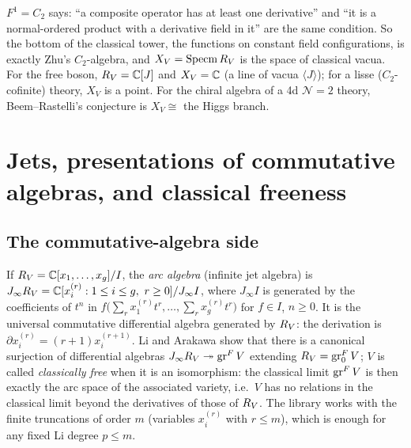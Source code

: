 \begin{physics}
$F^1 = C_2$ says: ``a composite operator has at least one derivative'' and ``it is a normal-ordered product
with a derivative field in it'' are the same condition. So the bottom of the classical tower, the functions
on constant field configurations, is exactly Zhu's $C_2$-algebra, and $X_V = \operatorname{Specm}R_V$
is the space of classical vacua. For the free boson, $R_V = {\mathbb{C}}[J]$ and $X_V = {\mathbb{C}}$ (a line of vacua
$\langle J\rangle$); for a lisse ($C_2$-cofinite) theory, $X_V$ is a point. For the chiral algebra of a 4d
$\mathcal N=2$ theory, Beem--Rastelli's conjecture is $X_V\cong$ the Higgs branch.
\end{physics}


\section{Jets, presentations of commutative algebras, and classical freeness}\label{l11:sec:jets}

\subsection{The commutative-algebra side}

If $R_V = {\mathbb{C}}[x_1,\dots,x_g]/I$, the \emph{arc algebra} (infinite jet algebra) is
$J_\infty R_V = {\mathbb{C}}[x_i^{(r)} : 1\le i\le g,\ r\ge0]/J_\infty I$, where $J_\infty I$ is generated by the
coefficients of $t^n$ in $f\bigl(\sum_rx_1^{(r)}t^r,\dots,\sum_rx_g^{(r)}t^r\bigr)$ for $f\in I$, $n\ge0$. It is
the universal commutative differential algebra generated by $R_V$: the derivation is
$\partial x_i^{(r)} = (r+1)x_i^{(r+1)}$. Li and Arakawa show that there is a canonical surjection of differential
algebras $J_\infty R_V\twoheadrightarrow\operatorname{gr}^FV$ extending $R_V = \operatorname{gr}^F_0V$; $V$ is called
\emph{classically free} when it is an isomorphism: the classical limit $\operatorname{gr}^FV$ is then exactly the arc space of the
associated variety, i.e.\ $V$ has no relations in the classical limit beyond the derivatives of those of $R_V$. The library works with the finite truncations of order $m$
(variables $x_i^{(r)}$ with $r\le m$), which is enough for any fixed Li degree $p\le m$.

